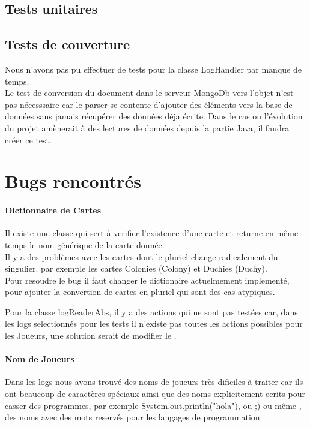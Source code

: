 \subsection{Tests unitaires}



\subsection{Tests de couverture}
Nous n'avons pas pu effectuer de tests pour la classe LogHandler par manque de temps.\\ Le test de conversion du document dans le serveur MongoDb vers l'objet n'est pas nécesssaire car le parser se contente d'ajouter des éléments vers la base de données sans jamais récupérer des données déja écrite. Dans le cas ou l'évolution du projet amènerait à des lectures de données depuis la partie Java, il faudra créer ce test.

\section{Bugs rencontrés}

\paragraph*{Dictionnaire de Cartes} 

Il existe une classe qui sert à verifier l'existence d'une carte et returne en même temps le nom générique de la carte donnée.\\
Il y a des problèmes avec les cartes dont le pluriel change radicalement du singulier. par exemple les cartes Colonies (Colony) et Duchies (Duchy). \\

Pour resoudre le bug il faut changer le dictionaire actuelmement implementé, pour ajouter la convertion de cartes en pluriel qui sont des cas atypiques.

Pour la classe logReaderAbs, il y a des actions qui ne sont pas testées car, dans les logs selectionnés pour les tests il n'existe pas toutes les actions possibles pour les Joueurs, une solution serait de modifier le .

\paragraph*{Nom de Joueurs} 

Dans les logs nous avons trouvé des noms de joueurs très dificiles à traiter car ils ont beaucoup de caractères spéciaux ainsi que des noms explicitement ecrits pour casser des programmes,
par exemple System.out.println("hola"), ou ;) ou même , des noms avec des mots reservés pour les langages de programmation.


